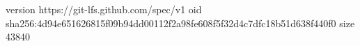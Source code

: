 version https://git-lfs.github.com/spec/v1
oid sha256:4d94e651626815f09b94dd00112f2a98fe608f5f32d4c7dfc18b51d638f440f0
size 43840
